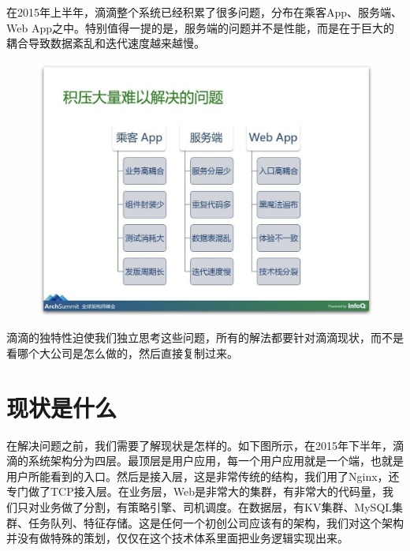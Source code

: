 \documentclass[12pt]{article}
\begin{document}
在2015年上半年，滴滴整个系统已经积累了很多问题，分布在乘客App、服务端、Web App之中。特别值得一提的是，服务端的问题并不是性能，而是在于巨大的耦合导致数据紊乱和迭代速度越来越慢。

\begin{figure}[H]
    \centering
    \includegraphics[width=1\textwidth]{fig/DIDI_Reconstruction_3.png}
\end{figure}

滴滴的独特性迫使我们独立思考这些问题，所有的解法都要针对滴滴现状，而不是看哪个大公司是怎么做的，然后直接复制过来。

\section{现状是什么}
在解决问题之前，我们需要了解现状是怎样的。如下图所示，在2015年下半年，滴滴的系统架构分为四层。最顶层是用户应用，每一个用户应用就是一个端，也就是用户所能看到的入口。然后是接入层，这是非常传统的结构，我们用了Nginx，还专门做了TCP接入层。在业务层，Web是非常大的集群，有非常大的代码量，我们只对业务做了分割，有策略引擎、司机调度。在数据层，有KV集群、MySQL集群、任务队列、特征存储。这是任何一个初创公司应该有的架构，我们对这个架构并没有做特殊的策划，仅仅在这个技术体系里面把业务逻辑实现出来。
\end{document}
